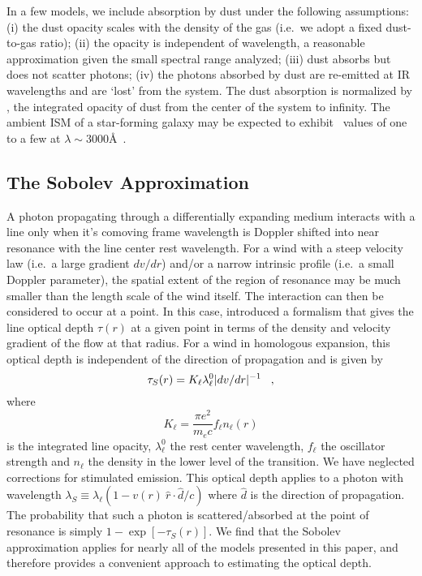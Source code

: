 \documentclass[12pt,preprint]{aastex}
\begin{document}
In a few models, we include absorption by dust under the following
assumptions:
(i) the dust opacity scales with the density of the gas (i.e.\ we
adopt a fixed dust-to-gas ratio);
(ii) the opacity is independent of wavelength, a reasonable
approximation given the small spectral range analyzed;
(iii) dust absorbs but does not scatter photons;
(iv) the photons absorbed by dust are re-emitted at IR wavelengths
and are `lost' from the system.  The dust absorption is normalized by \taud, 
the integrated opacity of dust from the center of the system to
infinity.  The ambient ISM of a star-forming galaxy may be expected to exhibit
\taud\ values of one to a few at $\lambda \sim 3000$\AA\ \citep[e.g.][]{cf00}.

\subsection{The Sobolev Approximation}

A photon propagating through a differentially expanding medium
interacts with a line only when
it's comoving frame wavelength is Doppler shifted into near resonance with the line center rest wavelength. 
For a wind with a steep velocity law  (i.e.\ a large gradient $dv/dr$)
and/or a narrow intrinsic profile (i.e.\ a small Doppler parameter), the 
spatial extent of the region of resonance
may be much smaller than the length scale of the
wind itself.  The interaction can then 
be considered to occur at  a point.
In this case, \citet{sobolev60} introduced a formalism that gives the line optical depth $\tau(r)$ at  
a given point in terms of the density and
velocity gradient of the flow at that radius.  For a wind in homologous expansion,
this optical depth is independent of the direction of propagation and
is given by
\begin{equation}
\tau_S(r) = K_\ell   \lambda^0_\ell | dv/dr |^{-1} \;\;\; ,
\label{eqn:Sobolev}
\end{equation}
where 
\begin{equation}
K_\ell = \frac{\pi e^2}{m_e c} f_\ell n_\ell(r)
\end{equation}
is the integrated line opacity, $\lambda^0_\ell$ the rest center wavelength,
$f_\ell$ the oscillator strength and
$n_\ell$ the density in the lower level of the transition.   We have
neglected corrections for stimulated emission.   This optical
depth applies to a photon with wavelength $\lambda_S
\equiv \lambda_\ell (1- v(r)~\hat{r}  \cdot \hat{d} /c)$ where $\hat{d}$ is the 
direction of propagation.  The probability that such a photon
is scattered/absorbed at the point of resonance is simply $1 - \exp[-\tau_S(r)]$.
We find that the Sobolev approximation applies for nearly all of the
models presented in this paper, and therefore provides a convenient
approach to estimating the optical depth.
\end{document}
